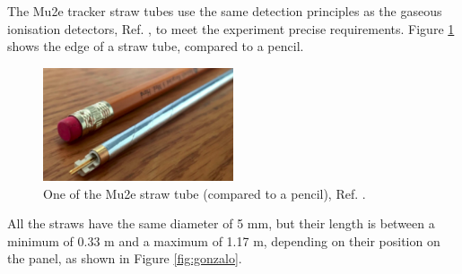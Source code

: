 The Mu2e tracker straw tubes use the same detection principles as the gaseous 
ionisation detectors, Ref. \cite{kola}, to 
meet the experiment precise requirements.
Figure \ref{fig:trkpencil} shows the edge of a straw tube, compared to a pencil.
\begin{figure}[!h]
    \centering
    \includegraphics[width =0.5\textwidth]{figures/png/Screenshot_20240327_000000.png}
    \caption[A Mu2e straw tube.]{One of the Mu2e straw tube (compared to a pencil), Ref. \cite{trk}.}
    \label{fig:trkpencil}
    \end{figure}


All the straws have the same diameter of 5 mm, but their length 
is between a minimum of 0.33 m and a maximum of 1.17 m, 
depending on their position on the panel, as shown in Figure \ref{fig:gonzalo}.

